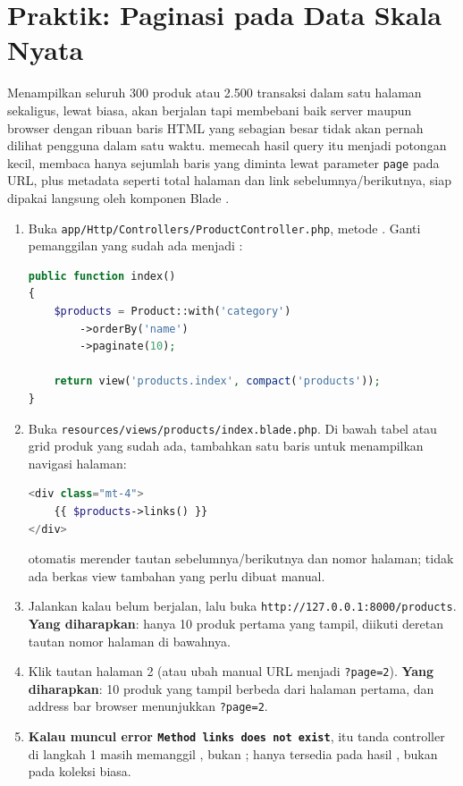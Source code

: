 \section{Praktik: Paginasi pada Data Skala Nyata}
\label{sec:eloquent-dan-relasi-3}

Menampilkan seluruh 300 produk atau 2.500 transaksi dalam satu halaman
sekaligus, lewat  biasa, akan berjalan tapi membebani
baik server maupun browser dengan ribuan baris HTML yang sebagian besar
tidak akan pernah dilihat pengguna dalam satu waktu.
 memecah hasil query itu menjadi potongan kecil,
membaca hanya sejumlah baris yang diminta lewat parameter \texttt{page}
pada URL, plus metadata seperti total halaman dan link
sebelumnya/berikutnya, siap dipakai langsung oleh komponen Blade
.

\begin{enumerate}
  \item Buka \texttt{app/Http/Controllers/ProductController.php}, metode
    . Ganti pemanggilan  yang sudah ada
    menjadi :
    \begin{lstlisting}[language=php, title=\lstfile{app/Http/Controllers/ProductController.php}]
public function index()
{
    $products = Product::with('category')
        ->orderBy('name')
        ->paginate(10);

    return view('products.index', compact('products'));
}
    \end{lstlisting}
  \item Buka \texttt{resources/views/products/index.blade.php}. Di bawah
    tabel atau grid produk yang sudah ada, tambahkan satu baris untuk
    menampilkan navigasi halaman:
    \begin{lstlisting}[language=php, title=\lstfile{resources/views/products/index.blade.php}]
<div class="mt-4">
    {{ $products->links() }}
</div>
    \end{lstlisting}
     otomatis merender tautan
    sebelumnya/berikutnya dan nomor halaman; tidak ada berkas view
    tambahan yang perlu dibuat manual.
  \item Jalankan  kalau belum berjalan, lalu
    buka \texttt{http://127.0.0.1:8000/products}. \textbf{Yang
    diharapkan}: hanya 10 produk pertama yang tampil, diikuti deretan
    tautan nomor halaman di bawahnya.
  \item Klik tautan halaman 2 (atau ubah manual URL menjadi
    \texttt{?page=2}). \textbf{Yang diharapkan}: 10 produk yang tampil
    berbeda dari halaman pertama, dan address bar browser menunjukkan
    \texttt{?page=2}.
  \item \textbf{Kalau muncul error \texttt{Method links does not
    exist}}, itu tanda controller di langkah 1 masih memanggil
    , bukan ; 
    hanya tersedia pada hasil , bukan pada
    koleksi biasa.
\end{enumerate}

